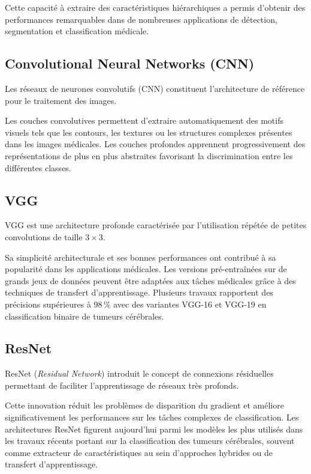 Cette capacité à extraire des caractéristiques hiérarchiques a permis d'obtenir des
performances remarquables dans de nombreuses applications de détection, segmentation et
classification médicale.

\subsection{Convolutional Neural Networks (CNN)}

Les réseaux de neurones convolutifs (CNN) constituent l'architecture de référence pour le
traitement des images.

Les couches convolutives permettent d'extraire automatiquement des motifs visuels tels que les
contours, les textures ou les structures complexes présentes dans les images médicales. Les
couches profondes apprennent progressivement des représentations de plus en plus abstraites
favorisant la discrimination entre les différentes classes.

\subsection{VGG}

VGG est une architecture profonde caractérisée par l'utilisation répétée de petites
convolutions de taille $3\times3$.

Sa simplicité architecturale et ses bonnes performances ont contribué à sa popularité dans
les applications médicales. Les versions pré-entraînées sur de grands jeux de données
peuvent être adaptées aux tâches médicales grâce à des techniques de transfert
d'apprentissage. Plusieurs travaux rapportent des précisions supérieures à 98\,\% avec des
variantes VGG-16 et VGG-19 en classification binaire de tumeurs cérébrales.

\subsection{ResNet}

ResNet (\emph{Residual Network}) introduit le concept de connexions résiduelles permettant de
faciliter l'apprentissage de réseaux très profonds.

Cette innovation réduit les problèmes de disparition du gradient et améliore
significativement les performances sur les tâches complexes de classification. Les
architectures ResNet figurent aujourd'hui parmi les modèles les plus utilisés dans les
travaux récents portant sur la classification des tumeurs cérébrales, souvent comme extracteur
de caractéristiques au sein d'approches hybrides ou de transfert d'apprentissage.

